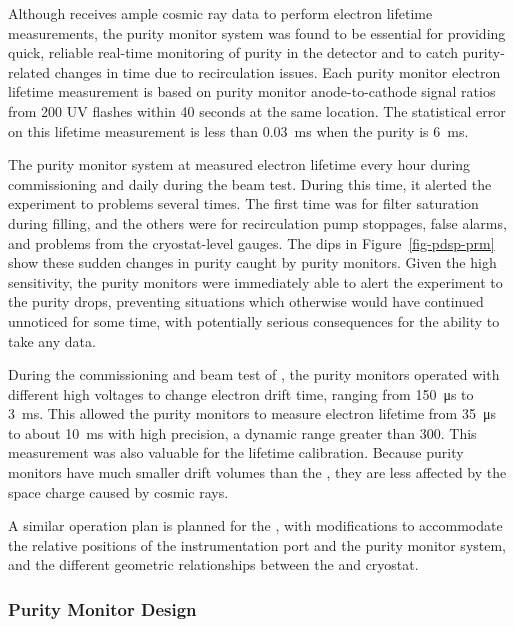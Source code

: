 Although  receives ample cosmic ray data to perform electron lifetime measurements, the purity monitor system was found to be essential for providing quick, reliable real-time monitoring of purity in the detector and to catch purity-related changes in time due to  recirculation issues. 
Each purity monitor electron lifetime measurement is based on purity monitor anode-to-cathode signal ratios from 200 UV flashes within 40 seconds at the same location. The statistical error on this lifetime measurement is less than \SI{0.03}{ms} when the purity is \SI{6}{ms}. 

The purity monitor system at  measured electron lifetime every hour during commissioning and daily during the beam test. During 
this time, it alerted the experiment to problems several times. 
The first time was for filter saturation during  filling, and the others were for recirculation pump stoppages, false alarms, and problems from the cryostat-level gauges.  The dips in Figure~\ref{fig-pdsp-prm} show these sudden changes in purity caught by purity monitors. 
Given the high sensitivity, the  purity monitors  were immediately able to alert the experiment to the purity drops, 
preventing situations which otherwise would have continued unnoticed for some time, with potentially serious consequences for the ability to take any data. 

During the commissioning and beam test of , the purity monitors operated with different high voltages to change electron drift time, ranging from \SI{150}{\micro\second} to \SI{3}{\milli\second}. This allowed the  purity monitors to measure electron lifetime from \SI{35}{\micro\second} to about \SI{10}{\milli\second} with high precision, a dynamic range greater than \num{300}. 
This measurement was also valuable for the  lifetime calibration. Because purity monitors have much smaller drift volumes than the , they are less affected by the space charge caused by cosmic rays. 

  A similar %
  operation plan is planned for %
  the , with modifications to accommodate the relative positions of the instrumentation port %
  and the purity monitor system, and the %
  different geometric relationships between the  and cryostat.

\subsubsection{Purity Monitor Design}

